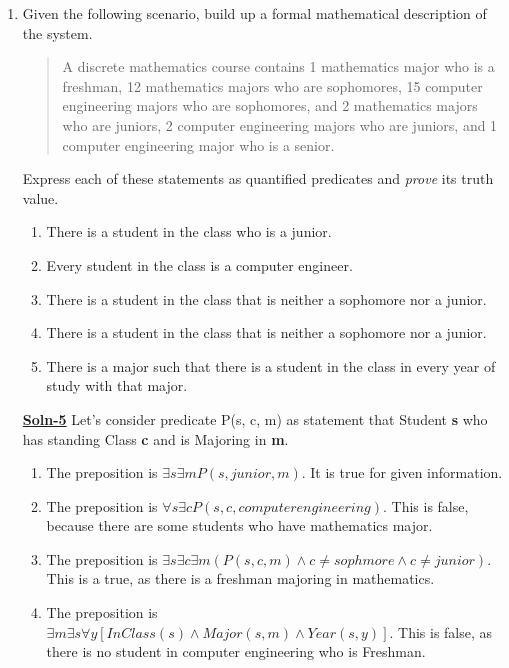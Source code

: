 \documentclass{article}
\begin{document}
\begin{enumerate}
\item   Given the following scenario, build up a formal
        mathematical description of the system.
        \begin{quote}
            A discrete mathematics course contains 1 mathematics
            major who is a freshman, 12 mathematics majors who are
            sophomores, 15 computer engineering majors who are sophomores,
            and 2 mathematics majors who are juniors, 2 computer
            engineering majors who are juniors,
            and 1 computer engineering major who is a senior.
        \end{quote}
        Express each of these statements as quantified predicates
        and \emph{prove} its truth value.
        \begin{enumerate}
        \item   There is a student in the class who is a junior.
        \item   Every student in the class is a computer engineer.
        \item   There is a student in the class that is neither
                a sophomore nor a junior.
        \item   There is a student in the class that is neither
                a sophomore nor a junior.
        \item   There is a major such that there is a student in
                the class in every year of study with that
                major.
        \end{enumerate}

        \textbf{\underline{Soln-5}} Let’s consider predicate P(s, c, m) as statement that Student \textbf{s} who has standing Class \textbf{c} and is Majoring in \textbf{m}. 

        \begin{enumerate}
            \item The preposition is $\exists s \exists mP(s, junior, m)$. It is true for given information.
            \item The preposition is $\forall s \exists cP(s, c, computer engineering)$. This is false, because there are some students who have mathematics major.
            \item The preposition is $\exists s \exists c \exists m(P(s, c, m) \wedge c \neq sophmore \wedge c \neq junior)$. This is a true, as there is a freshman majoring in mathematics.
            \item The preposition is $\exists m \exists s \forall y [InClass(s) \wedge Major(s,m) \wedge Year(s,y)]$. This is false, as there is no student in computer engineering who is Freshman.
        \end{enumerate}


\end{enumerate}
\end{document}

